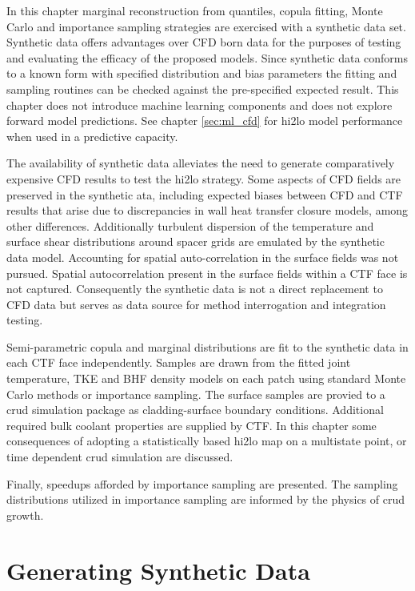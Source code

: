 
In this chapter marginal reconstruction from quantiles, copula fitting, Monte Carlo and importance sampling strategies are exercised with a synthetic data set.  Synthetic data offers advantages over CFD born data for the purposes of testing and evaluating the efficacy of the proposed models.  Since synthetic data conforms to a known form with specified distribution and bias parameters the fitting and sampling routines can be checked against the pre-specified expected result.
This chapter does not introduce machine learning components and does not explore forward model predictions.  See chapter \ref{sec:ml_cfd} for hi2lo model performance when used in a predictive capacity.

The availability of synthetic data alleviates the need to generate comparatively expensive CFD results to test the hi2lo strategy.  Some aspects of CFD fields are preserved in the synthetic ata, including expected biases between CFD and CTF results that arise due to discrepancies in wall heat transfer closure models, among other differences. Additionally turbulent dispersion of the temperature and surface shear distributions around spacer grids are emulated by the synthetic data model.  Accounting for spatial auto-correlation in the surface fields was not pursued.  Spatial autocorrelation present in the surface fields within a CTF face is not captured.  Consequently the synthetic data is not a direct replacement to CFD data but serves as data source for method interrogation and integration testing.

Semi-parametric copula and marginal distributions are fit to the synthetic data in each CTF face independently.  Samples are drawn from the fitted joint temperature, TKE and BHF density models on each patch using standard Monte Carlo methods or importance sampling.  The surface samples are provied to a crud simulation package as cladding-surface boundary conditions.  Additional required bulk coolant properties are supplied by CTF.
In this chapter some consequences of adopting a statistically based hi2lo map  on a multistate point, or time dependent crud simulation are discussed.

Finally, speedups afforded by importance sampling are presented.  The sampling distributions utilized in importance sampling are informed by the physics of crud growth.

\section{Generating Synthetic Data}

